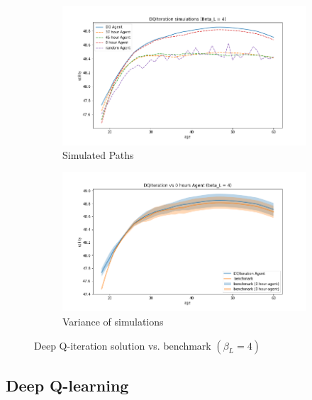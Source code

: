 \begin{figure}[ht]
\begin{subfigure}{.5\textwidth}
  \centering
  \includegraphics[width=1\linewidth]{figures/dqi_model1_beta_4_solution_benchmark_paths.png}
  \caption{Simulated Paths}
  \label{fig:dqi_solution_beta4_path}
\end{subfigure}%
\begin{subfigure}{.5\textwidth}
  \centering
  \includegraphics[width=1\linewidth]{figures/dqi_model1_beta_4_solution_benchmark_variance.png}
  \caption{Variance of simulations}
  \label{fig:dqi_solution_beta4_var}
\end{subfigure}
    \caption{Deep Q-iteration solution vs. benchmark $(\beta_L = 4)$}
    \label{fig:dqi_solution_beta4}
\end{figure}

\newpage

\subsection{Deep Q-learning}

